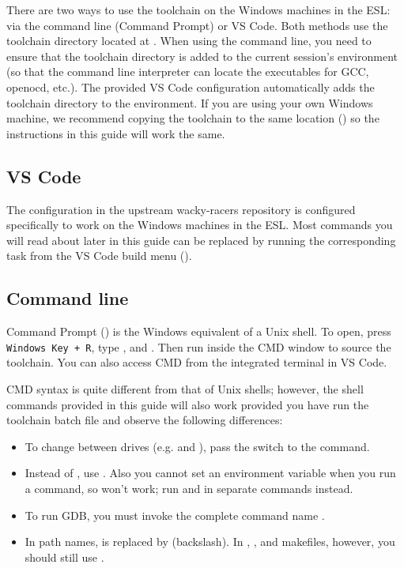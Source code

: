 There are two ways to use the toolchain on the Windows machines in the
ESL: via the command line (Command Prompt) or VS Code. Both methods use
the toolchain directory located at .
When using the command line, you need to ensure that the toolchain
directory is added to the current session's environment (so that the
command line interpreter can locate the executables for GCC, openocd,
etc.). The provided VS Code configuration automatically adds the
toolchain directory to the environment. If you are using your own
Windows machine, we recommend copying the toolchain to the same location
() so the instructions in this guide
will work the same.

\subsection{VS Code}

The  configuration in the upstream wacky-racers repository
is configured specifically to work on the Windows machines in the ESL.
Most  commands you will read about later in this guide can be
replaced by running the corresponding task from the VS Code build menu
().

\subsection{Command line}\label{esl-windows/command-line}

Command Prompt () is the Windows equivalent of a Unix
shell. To open, press \verb|Windows Key + R|, type , and
. Then run
 inside the
CMD window to source the toolchain. You can also access CMD from the
integrated terminal in VS Code.

CMD syntax is quite different from that of Unix shells; however, the
shell commands provided in this guide will also work provided you have
run the toolchain batch file and observe the following differences:
\begin{itemize}
\item To change between drives (e.g.  and ), pass the
 switch to the  command.
\item Instead of , use .
Also you cannot set an environment variable when you run a command, so
 won't work; run  and  in
separate commands instead.
\item To run GDB, you must invoke the complete command name
.
\item In path names, \file{/} is replaced by \file{\textbackslash}
(backslash). In , , and makefiles, however, you
should still use \file{/}.
\end{itemize}

